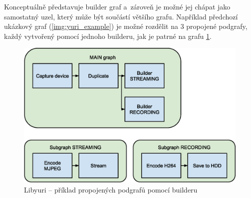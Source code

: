 \documentclass[thesis=M,czech]{FITthesis}[2012/06/26]
\begin{document}
Konceptuálně představuje builder graf a~zároveň je možné jej chápat jako samostatný uzel, který může být součástí většího grafu. Například předchozí ukázkový graf (\ref{img:yuri_example}) je možné rozdělit na 3 propojené podgrafy, každý vytvořený pomocí jednoho builderu, jak je patrné na grafu \ref{img:yuri_subgraph}.
\\
\begin{figure}[h]\centering
	\includegraphics[width=1\textwidth]{images/yuri_subgraph.eps}
	\caption{Libyuri -- příklad propojených podgrafů pomocí builderu}\label{img:yuri_subgraph}
\end{figure}
\end{document}
